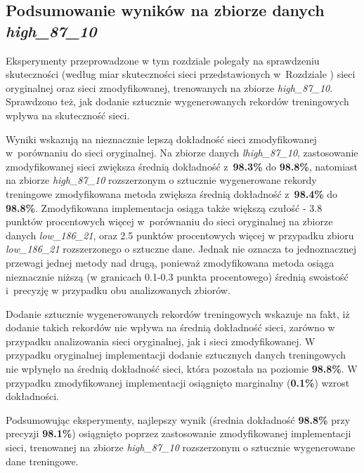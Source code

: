 \subsection{Podsumowanie wyników na zbiorze danych \textit{high\_87\_10}}
Eksperymenty przeprowadzone w tym rozdziale polegały na sprawdzeniu skuteczności (według miar skuteczności sieci przedstawionych w~Rozdziale ) sieci oryginalnej oraz sieci zmodyfikowanej, trenowanych na zbiorze \textit{high\_87\_10}.
Sprawdzono też, jak dodanie sztucznie wygenerowanych rekordów treningowych wpływa na skuteczność sieci.

Wyniki wskazują na nieznacznie lepszą dokładność sieci zmodyfikowanej w~porównaniu do sieci oryginalnej.
Na zbiorze danych \textit{lhigh\_87\_10}, zastosowanie zmodyfikowanej sieci zwiększa średnią dokładność z~\textbf{98.3\%} do \textbf{98.8\%}, natomiast na zbiorze \textit{high\_87\_10} rozszerzonym o sztucznie wygenerowane rekordy treningowe zmodyfikowana metoda zwiększa średnią dokładność z~\textbf{98.4\%} do \textbf{98.8\%}. 
Zmodyfikowana implementacja osiąga także większą czułość - 3.8 punktów procentowych więcej w~porównaniu do sieci oryginalnej na zbiorze danych \textit{low\_186\_21}, oraz 2.5 punktów procentowych więcej w przypadku zbioru \textit{low\_186\_21} rozszerzonego o sztuczne dane.
Jednak nie oznacza to jednoznacznej przewagi jednej metody nad drugą, ponieważ zmodyfikowana metoda osiąga nieznacznie niższą (w granicach 0.1-0.3 punkta procentowego) średnią swoistość i~precyzję w przypadku obu analizowanych zbiorów.


Dodanie sztucznie wygenerowanych rekordów treningowych wskazuje na fakt, iż dodanie takich rekordów nie wpływa na średnią dokładność sieci, zarówno w przypadku analizowania sieci oryginalnej, jak i sieci zmodyfikowanej. W przypadku oryginalnej implementacji dodanie sztucznych danych treningowych nie wpłynęło na średnią dokładność sieci, która pozostała na poziomie \textbf{98.8\%}. W przypadku zmodyfikowanej implementacji osiągnięto marginalny (\textbf{0.1\%}) wzrost dokładności.


Podsumowując eksperymenty, najlepszy wynik (średnia dokładność \textbf{98.8\%} przy precyzji \textbf{98.1\%}) osiągnięto poprzez zastosowanie zmodyfikowanej implementacji sieci, trenowanej na zbiorze \textit{high\_87\_10} rozszerzonym o sztucznie wygenerowane dane treningowe.
